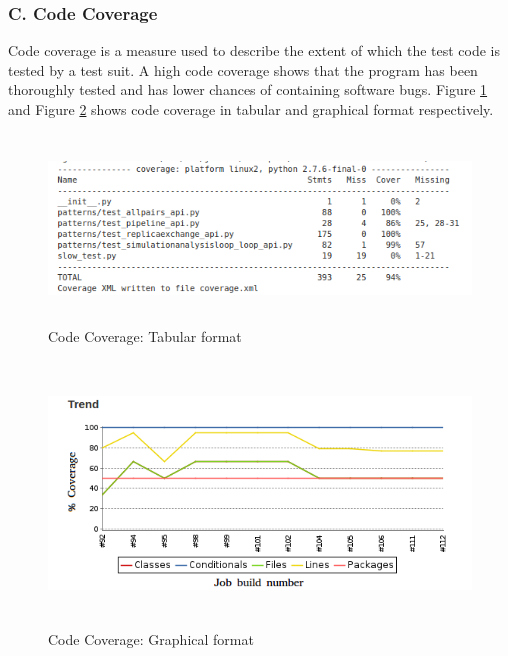 \documentclass[10pt]{ruthesis}
\begin{document}
\subsubsection{\textbf{C. Code Coverage}}
Code coverage is a measure used to describe the extent of which the test code is tested by a test suit. A high code coverage shows that the program has been thoroughly tested and has lower chances of containing software bugs. Figure \ref{fig:cov_table} and Figure \ref{fig:cov_graph} shows code coverage in tabular and graphical format respectively.

\begin{figure}
 \begin{center}
  \includegraphics[width=15cm,height=5cm]{code_cov.png}
  \caption{Code Coverage: Tabular format}
  \label{fig:cov_table}
  \end{center}
\end{figure}


\begin{figure}
 \begin{center}
  \includegraphics[width=15cm,height=7cm]{cov_graph.png}
  \caption{Code Coverage: Graphical format}
  \label{fig:cov_graph}
  \end{center}
\end{figure}
\end{document}
